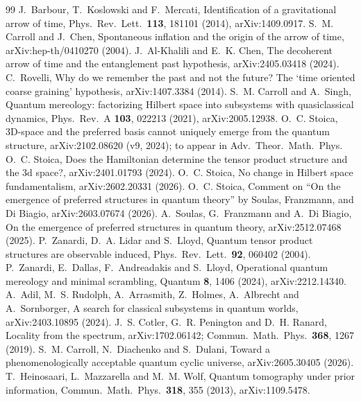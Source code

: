 \documentclass[11pt]{article}
\theoremstyle{definition}
\theoremstyle{remark}
\begin{document}
{\footnotesize\setlength{\itemsep}{0pt}\begin{thebibliography}{99}
 J.~Barbour, T.~Koslowski and F.~Mercati, Identification of a gravitational arrow of time, Phys.\ Rev.\ Lett.\ \textbf{113}, 181101 (2014), arXiv:1409.0917.
 S.~M. Carroll and J.~Chen, Spontaneous inflation and the origin of the arrow of time, arXiv:hep-th/0410270 (2004).
 J.~Al-Khalili and E.~K. Chen, The decoherent arrow of time and the entanglement past hypothesis, arXiv:2405.03418 (2024). %
 C.~Rovelli, Why do we remember the past and not the future? The `time oriented coarse graining' hypothesis, arXiv:1407.3384 (2014).
 S.~M. Carroll and A.~Singh, Quantum mereology: factorizing Hilbert space into subsystems with quasiclassical dynamics, Phys.\ Rev.\ A \textbf{103}, 022213 (2021), arXiv:2005.12938.
 O.~C. Stoica, 3D-space and the preferred basis cannot uniquely emerge from the quantum structure, arXiv:2102.08620 (v9, 2024); to appear in Adv.\ Theor.\ Math.\ Phys.
 O.~C. Stoica, Does the Hamiltonian determine the tensor product structure and the 3d space?, arXiv:2401.01793 (2024).
 O.~C. Stoica, No change in Hilbert space fundamentalism, arXiv:2602.20331 (2026).
 O.~C. Stoica, Comment on ``On the emergence of preferred structures in quantum theory'' by Soulas, Franzmann, and Di Biagio, arXiv:2603.07674 (2026).
 A.~Soulas, G.~Franzmann and A.~Di Biagio, On the emergence of preferred structures in quantum theory, arXiv:2512.07468 (2025).
 P.~Zanardi, D.~A. Lidar and S.~Lloyd, Quantum tensor product structures are observable induced, Phys.\ Rev.\ Lett.\ \textbf{92}, 060402 (2004).
 P.~Zanardi, E.~Dallas, F.~Andreadakis and S.~Lloyd, Operational quantum mereology and minimal scrambling, Quantum \textbf{8}, 1406 (2024), arXiv:2212.14340.
 A.~Adil, M.~S. Rudolph, A.~Arrasmith, Z.~Holmes, A.~Albrecht and A.~Sornborger, A search for classical subsystems in quantum worlds, arXiv:2403.10895 (2024).
 J.~S. Cotler, G.~R. Penington and D.~H. Ranard, Locality from the spectrum, arXiv:1702.06142; Commun.\ Math.\ Phys.\ \textbf{368}, 1267 (2019).
 S.~M. Carroll, N.~Diachenko and S.~Dulani, Toward a phenomenologically acceptable quantum cyclic universe, arXiv:2605.30405 (2026).
 T.~Heinosaari, L.~Mazzarella and M.~M. Wolf, Quantum tomography under prior information, Commun.\ Math.\ Phys.\ \textbf{318}, 355 (2013), arXiv:1109.5478.

\end{thebibliography}}
\end{document}
